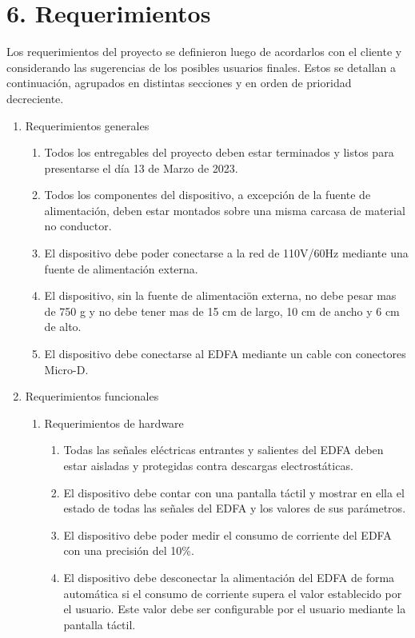 \documentclass[
11pt, %
]{charter}
\begin{document}
\section{6. Requerimientos}
\label{sec:requerimientos}

Los requerimientos del proyecto se definieron luego de acordarlos con el cliente y considerando las sugerencias de los posibles usuarios finales. Estos se detallan a continuación, agrupados en distintas secciones y en orden de prioridad decreciente.

\begin{enumerate}
	\item Requerimientos generales
		\begin{enumerate}
			\item Todos los entregables del proyecto deben estar terminados y listos para presentarse el día 13 de Marzo de 2023.
			\item Todos los componentes del dispositivo, a excepción de la fuente de alimentación, deben estar montados sobre una misma carcasa de material no conductor.
			\item El dispositivo debe poder conectarse a la red de 110V/60Hz mediante una fuente de alimentación externa.
			\item El dispositivo, sin la fuente de alimentaciön externa, no debe pesar mas de 750 g y no debe tener mas de 15 cm de largo, 10 cm de ancho y 6 cm de alto.
			\item El dispositivo debe conectarse al EDFA mediante un cable con conectores Micro-D.
		\end{enumerate}
	\item Requerimientos funcionales
		\begin{enumerate}
			\item Requerimientos de hardware
				\begin{enumerate}[label*=\arabic*.]
					\item Todas las señales eléctricas entrantes y salientes del EDFA deben estar aisladas y protegidas contra descargas electrostáticas.
					\item El dispositivo debe contar con una pantalla táctil y mostrar en ella el estado de todas las señales del EDFA y los valores de sus parámetros.
					\item El dispositivo debe poder medir el consumo de corriente del EDFA con una precisión del 10\%.
					\item El dispositivo debe desconectar la alimentación del EDFA de forma automática si el consumo de corriente supera el valor establecido por el usuario. Este valor debe ser configurable por el usuario mediante la pantalla táctil.

\end{enumerate}
\end{enumerate}
\end{enumerate}
\end{document}
